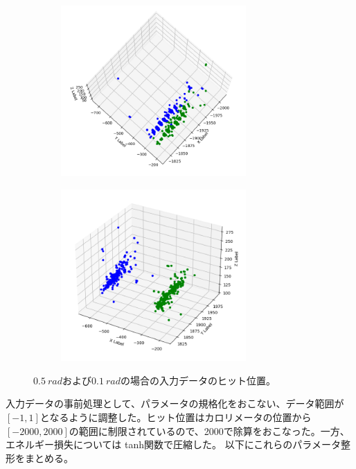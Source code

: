 \begin{figure}[H]
	\begin{subfigure}{.5\textwidth}
		\begin{center}
 		 	\includegraphics[width=200pt]{./Figure/DLAnalysis/Double1.png}%
  			\caption{}
  			\label{fig:sfig1}
 		\end{center}
	\end{subfigure}
	\begin{subfigure}{.5\textwidth}
		\begin{center}
			\includegraphics[width=200pt]{./Figure/DLAnalysis/Double5.png}%
			\caption{}
			\label{fig:sfig2}
		\end{center}
	\end{subfigure}
	\caption[DoubleParticleGunによる$\SI{0.5}{rad}$および$\SI{0.1}{rad}$の場合の入力データのヒット位置]{$\SI{0.5}{rad}$および$\SI{0.1}{rad}$の場合の入力データのヒット位置。}
	\label{DoublePG}
\end{figure}

入力データの事前処理として、パラメータの規格化をおこない、データ範囲が$[-1,1]$となるように調整した。ヒット位置はカロリメータの位置から$[-2000,2000]$の範囲に制限されているので、2000で除算をおこなった。一方、エネルギー損失については tanh関数で圧縮した。
以下にこれらのパラメータ整形をまとめる。

